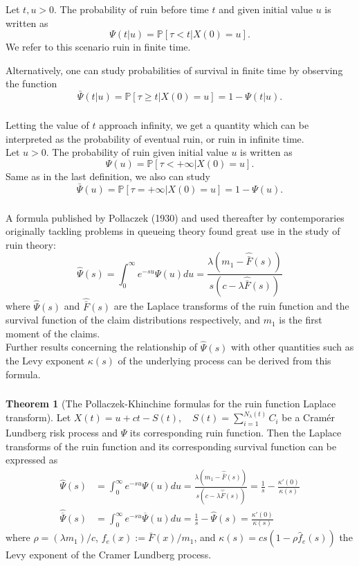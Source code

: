 \documentclass[xcolor=pdftex,dvipsnames,table]{beamer}
\theoremstyle{definition}
\newtheorem*{thm}{Theorem}
\def\Rui{\Psi} \def\sRui{\overline{\Psi}}
\begin{document}
\begin{frame}
\frametitle{\insertsectionhead}
Let $t, u >0$. The probability of ruin before time $t$ and given initial value $u$ is written as
\[\Psi(t|u) = \mathbb{P} [\tau < t | X(0)=u ].  \]
We refer to this scenario ruin in finite time.\\ \pause

Alternatively, one can study probabilities of survival in finite time by observing the function
\[ \bar {\Psi} (t|u) = \mathbb{P} [\tau \geq t | X(0)=u ] = 1 - \Psi (t|u) . \]
\end{frame}

\begin{frame}
\frametitle{\insertsectionhead}
Letting the value of $t$ approach infinity, we get a quantity which can be interpreted as the probability of eventual ruin, or ruin in infinite time.\\
Let $u >0$. The probability of ruin given initial value $u$ is written as
\[\Psi(u) = \mathbb{P} [\tau < +\infty | X(0)=u ]. \]
Same as in the last definition, we also can study 
\[ \bar {\Psi} (u) = \mathbb{P} [\tau = + \infty | X(0)=u ] = 1 - \Psi (u). \]
\end{frame}

\begin{frame}
\frametitle{\insertsectionhead}
A formula published by Pollaczek (1930) and used thereafter by contemporaries originally tackling problems in queueing theory found great use in the study of ruin theory:
\[\hat \Psi(s) = \int_0^{\infty} e^{-s u} \Psi(u) du
= \frac{\lambda (m_1 - \hat{\bar{F}}(s))}{s (c-\lambda \hat{\bar{F}}(s)) }\]
where $\hat \Psi(s)$ and $\hat{\bar{F}}(s)$ are the Laplace transforms of the ruin function and the survival function of the claim distributions respectively, and $m_1$ is the first moment of the claims.\\
Further results concerning the relationship of $\hat \Psi(s)$ with other quantities such as the Levy exponent $\kappa (s)$ of the underlying process can be derived from this formula.
\end{frame}


\begin{frame}
\frametitle{\insertsectionhead}
\begin{thm}[The Pollaczek-Khinchine formulas for the ruin function Laplace transform]
Let $X(t) = u + ct - S(t), \quad S(t) = \sum_{i=1}^{N_\lambda (t)} C_i$ be a Cram\'er Lundberg risk process and $\Psi$ its corresponding ruin function. Then the Laplace transforms of the ruin function and its corresponding survival function can be expressed as
\begin{align*}
\hat \Rui(s) &= \int_0^{\infty} e^{-s u} \Rui(u) du
= \frac{\lambda (m_1 - \hat{\bar{F}}(s))}{s (c-\lambda \hat{\bar{F}}(s)) } = \frac{1}{s}- \frac{ \kappa'(0)}{ \kappa(s)} \\
\hat \sRui(s) &= \int_0^{\infty} e^{-s u} \sRui(u) du = \frac{1}{s} - \hat \Rui(s) = \frac{\kappa'(0)}{\kappa(s)}
\end{align*}
where $\rho =(\lambda m_1)/c$, $f_e(x):=\bar{F}(x)/m_1$, and $\kappa(s) =  cs( 1- \rho \hat f_e(s)) $ the Levy exponent of the Cramer Lundberg process.
\end{thm}
\end{frame}
\end{document}
